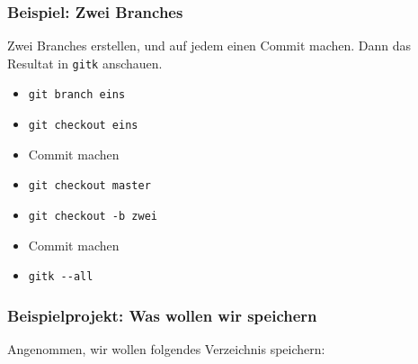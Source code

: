 \documentclass{beamer}
\begin{document}
\begin{frame}
 \frametitle{Beispiel: Zwei Branches}



Zwei Branches erstellen, und auf jedem einen Commit machen. Dann das
Resultat in \texttt{gitk} anschauen.

\begin{itemize}
	\item \texttt{git branch eins}
	\item \texttt{git checkout eins}
	\item Commit machen
	\item \texttt{git checkout master}
	\item \texttt{git checkout -b zwei}
	\item Commit machen
	\item \texttt{gitk -{}-all}
\end{itemize}


 \end{frame}
\begin{frame}
 \frametitle{Beispielprojekt: Was wollen wir speichern}



Angenommen, wir wollen folgendes Verzeichnis speichern:


\vspace{0.5cm}




 \end{frame}
\end{document}
